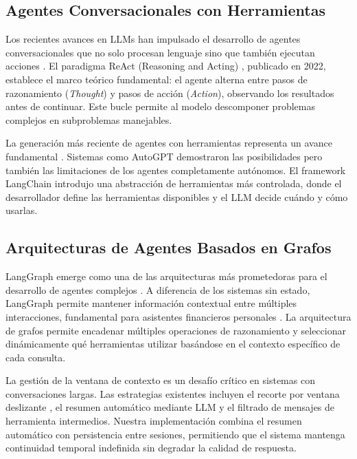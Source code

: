 \subsection{Agentes Conversacionales con Herramientas}
\label{subsec:agentes_herramientas}

Los recientes avances en LLMs han impulsado el desarrollo de agentes conversacionales que no solo procesan lenguaje sino que también ejecutan acciones \cite{tool_using_agents2023}. El paradigma ReAct (Reasoning and Acting) \cite{react2022}, publicado en 2022, establece el marco teórico fundamental: el agente alterna entre pasos de razonamiento (\textit{Thought}) y pasos de acción (\textit{Action}), observando los resultados antes de continuar. Este bucle permite al modelo descomponer problemas complejos en subproblemas manejables.

La generación más reciente de agentes con herramientas representa un avance fundamental \cite{langchain2023}. Sistemas como AutoGPT demostraron las posibilidades pero también las limitaciones de los agentes completamente autónomos. El framework LangChain introdujo una abstracción de herramientas más controlada, donde el desarrollador define las herramientas disponibles y el LLM decide cuándo y cómo usarlas.

\subsection{Arquitecturas de Agentes Basados en Grafos}
\label{subsec:arquitecturas_grafos}

LangGraph emerge como una de las arquitecturas más prometedoras para el desarrollo de agentes complejos \cite{langgraph2024}. A diferencia de los sistemas sin estado, LangGraph permite mantener información contextual entre múltiples interacciones, fundamental para asistentes financieros personales \cite{memory_in_agents2023}. La arquitectura de grafos permite encadenar múltiples operaciones de razonamiento y seleccionar dinámicamente qué herramientas utilizar basándose en el contexto específico de cada consulta.

La gestión de la ventana de contexto es un desafío crítico en sistemas con conversaciones largas. Las estrategias existentes incluyen el recorte por ventana deslizante \cite{memory_in_agents2023}, el resumen automático mediante LLM y el filtrado de mensajes de herramienta intermedios. Nuestra implementación combina el resumen automático con persistencia entre sesiones, permitiendo que el sistema mantenga continuidad temporal indefinida sin degradar la calidad de respuesta.

